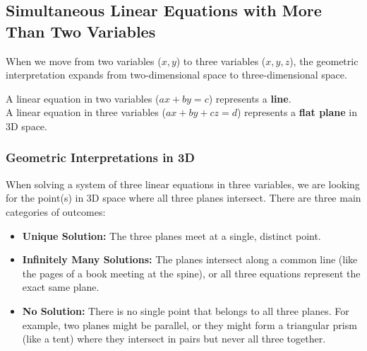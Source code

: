 
\subsection{Simultaneous Linear Equations with More Than Two Variables}

When we move from two variables ($x, y$) to three variables ($x, y, z$), the geometric interpretation expands from two-dimensional space to three-dimensional space.

A linear equation in two variables ($ax + by = c$) represents a \textbf{line}. \\
A linear equation in three variables ($ax + by + cz = d$) represents a \textbf{flat plane} in 3D space.

\subsubsection*{Geometric Interpretations in 3D}

When solving a system of three linear equations in three variables, we are looking for the point(s) in 3D space where all three planes intersect. There are three main categories of outcomes:

\begin{itemize}[leftmargin=*]
  \item \textbf{Unique Solution:} The three planes meet at a single, distinct point.
  \item \textbf{Infinitely Many Solutions:} The planes intersect along a common line (like the pages of a book meeting at the spine), or all three equations represent the exact same plane.
  \item \textbf{No Solution:} There is no single point that belongs to all three planes. For example, two planes might be parallel, or they might form a triangular prism (like a tent) where they intersect in pairs but never all three together.
\end{itemize}

